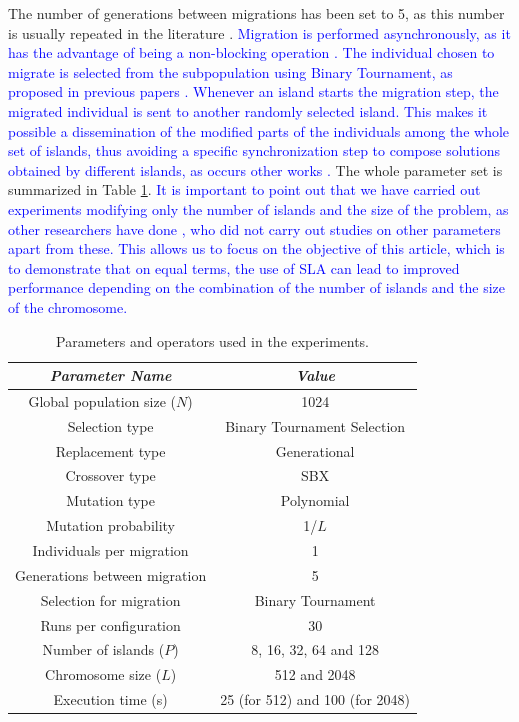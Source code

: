 \documentclass[preprint]{elsarticle}
\begin{document}
The number of generations between migrations has been set to 5, as
this number is usually repeated in the literature
\cite{Deb03distributed,Martens13asynchronous}. \textcolor{blue}{Migration
  is performed asynchronously, as it has the advantage of being a
  non-blocking operation \cite{TalbiUnified2018}. The individual
  chosen to migrate is selected from the subpopulation using Binary
  Tournament, as proposed in previous papers
  \cite{xiong2003parallel,Xiao03specialized}. Whenever an island
  starts the migration step, the migrated individual is sent to
  another randomly selected island. This makes it possible a
  dissemination of the modified parts of the individuals among the
  whole set of islands, thus avoiding a specific synchronization step
  to compose solutions obtained by different islands, as occurs other
  works \cite{Dorronsoro13superlinear}.} 
 The whole parameter set is summarized in Table \ref{tab:parameters}. 
 \textcolor{blue}{It is important to point out that we have carried out experiments modifying only the number of islands and the size of the problem, as other researchers have done \cite{CaoZLL17,Dorronsoro13superlinear,DorronsoroPSO2018,Martens13asynchronous,Durillo08masterslave}, who did not carry out studies on other parameters apart from these. This allows us to focus on the objective of this article, which is to demonstrate that on equal terms, the use of SLA can lead to improved performance depending on the combination of the number of islands and the size of the chromosome.}






\begin{table}
\begin{center}
\begin{tabular}{|c|c|}
\hline
{\em Parameter Name} & {\em Value} \\ \hline
Global population size ($N$) & 1024 \\ \hline
Selection type & Binary Tournament Selection \\ \hline
Replacement type & Generational \\ \hline 
Crossover type & SBX \\ \hline
Mutation  type & Polynomial\\ \hline
Mutation probability & 1/$L$ \\ \hline
Individuals per migration & 1 \\ \hline
Generations between migration & 5 \\ \hline
Selection for migration & Binary Tournament\\ \hline
Runs per configuration & 30 \\ \hline \hline
Number of islands ($P$) & 8, 16, 32, 64 and 128 \\ \hline
Chromosome size ($L$) & 512 and 2048 \\ \hline
Execution time (s) & 25 (for 512) and 100 (for 2048) \\ \hline \hline
\end{tabular}
\caption{Parameters and operators used in the experiments.}
\label{tab:parameters}
\end{center}
\end{table}
\end{document}
